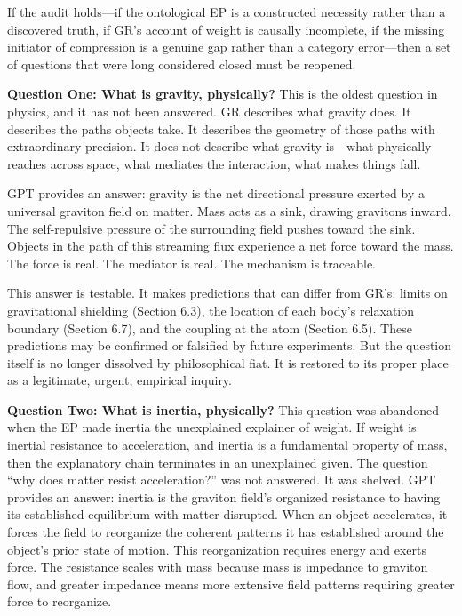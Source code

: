 \documentclass[11pt]{article}
\begin{document}
If the audit holds---if the ontological EP is a constructed necessity rather than a discovered truth, if GR's account of weight is causally incomplete, if the missing initiator of compression is a genuine gap rather than a category error---then a set of questions that were long considered closed must be reopened.

\textbf{Question One: What is gravity, physically?} This is the oldest question in physics, and it has not been answered. GR describes what gravity does. It describes the paths objects take. It describes the geometry of those paths with extraordinary precision. It does not describe what gravity is---what physically reaches across space, what mediates the interaction, what makes things fall.

GPT provides an answer: gravity is the net directional pressure exerted by a universal graviton field on matter. Mass acts as a sink, drawing gravitons inward. The self-repulsive pressure of the surrounding field pushes toward the sink. Objects in the path of this streaming flux experience a net force toward the mass. The force is real. The mediator is real. The mechanism is traceable.

This answer is testable. It makes predictions that can differ from GR's: limits on gravitational shielding (Section 6.3), the location of each body's relaxation boundary (Section 6.7), and the coupling at the atom (Section 6.5). These predictions may be confirmed or falsified by future experiments. But the question itself is no longer dissolved by philosophical fiat. It is restored to its proper place as a legitimate, urgent, empirical inquiry.

\textbf{Question Two: What is inertia, physically?} This question was abandoned when the EP made inertia the unexplained explainer of weight. If weight is inertial resistance to acceleration, and inertia is a fundamental property of mass, then the explanatory chain terminates in an unexplained given. The question ``why does matter resist acceleration?'' was not answered. It was shelved. GPT provides an answer: inertia is the graviton field's organized resistance to having its established equilibrium with matter disrupted. When an object accelerates, it forces the field to reorganize the coherent patterns it has established around the object's prior state of motion. This reorganization requires energy and exerts force. The resistance scales with mass because mass is impedance to graviton flow, and greater impedance means more extensive field patterns requiring greater force to reorganize.
\end{document}
